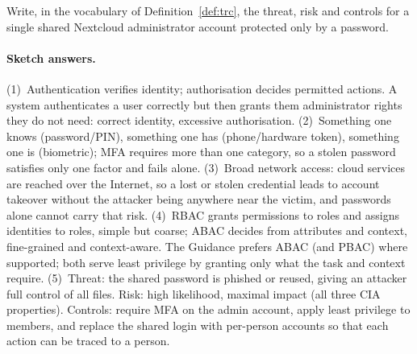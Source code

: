 \begin{exercise}
Write, in the vocabulary of Definition~\ref{def:trc}, the threat, risk and
controls for a single shared Nextcloud administrator account protected only by
a password.
\end{exercise}

\paragraph{Sketch answers.}
{\small
(1)~Authentication verifies identity; authorisation decides permitted
actions. A system authenticates a user correctly but then grants them
administrator rights they do not need: correct identity, excessive
authorisation. (2)~Something one knows (password/PIN), something one has
(phone/hardware token), something one is (biometric); MFA requires more than
one category, so a stolen password satisfies only one factor and fails alone.
(3)~Broad network access: cloud services are reached over the Internet, so a
lost or stolen credential leads to account takeover without the attacker
being anywhere near the victim, and passwords alone cannot carry that risk.
(4)~RBAC grants permissions to roles and assigns identities to roles, simple
but coarse; ABAC decides from attributes and context, fine-grained and
context-aware. The Guidance prefers ABAC (and PBAC) where supported; both
serve least privilege by granting only what the task and context require.
(5)~Threat: the shared password is phished or reused, giving an attacker full
control of all files. Risk: high likelihood, maximal impact (all three CIA
properties). Controls: require MFA on the admin account, apply least privilege
to members, and replace the shared login with per-person accounts so that
each action can be traced to a person.}



